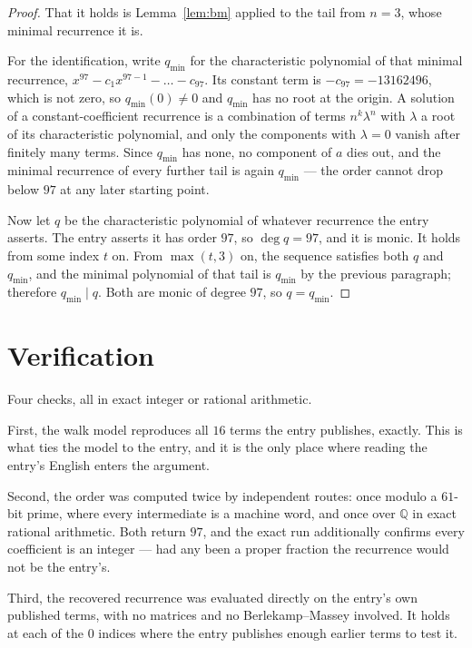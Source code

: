 \documentclass[11pt,a4paper]{article}
\theoremstyle{plain}
\theoremstyle{definition}
\begin{document}
\begin{proof}
That it holds is Lemma~\ref{lem:bm} applied to the tail from $n=3$, whose minimal
recurrence it is.

For the identification, write $q_{\min}$ for the characteristic polynomial of that minimal
recurrence, $x^{97}-c_1x^{97-1}-\dots-c_{97}$. Its constant term is
$-c_{97}=-13162496$, which is not zero, so $q_{\min}(0)\neq0$ and $q_{\min}$ has no
root at the origin. A solution of a constant-coefficient recurrence is a combination of terms
$n^{k}\lambda^{n}$ with $\lambda$ a root of its characteristic polynomial, and only the
components with $\lambda=0$ vanish after finitely many terms. Since $q_{\min}$ has none, no
component of $a$ dies out, and the minimal recurrence of every further tail is again
$q_{\min}$ --- the order cannot drop below $97$ at any later starting point.

Now let $q$ be the characteristic polynomial of whatever recurrence the entry asserts. The
entry asserts it has order $97$, so $\deg q=97$, and it is monic. It holds from some
index $t$ on. From $\max(t,3)$ on, the sequence satisfies both $q$ and $q_{\min}$, and
the minimal polynomial of that tail is $q_{\min}$ by the previous paragraph; therefore
$q_{\min}\mid q$. Both are monic of degree $97$, so $q=q_{\min}$.
\end{proof}

\section{Verification}

Four checks, all in exact integer or rational arithmetic.

First, the walk model reproduces all $16$ terms the entry publishes, exactly. This is
what ties the model to the entry, and it is the only place where reading the entry's English
enters the argument.

Second, the order was computed twice by independent routes: once modulo a $61$-bit prime, where
every intermediate is a machine word, and once over $\mathbb{Q}$ in exact rational arithmetic.
Both return $97$, and the exact run additionally confirms every coefficient is an integer
--- had any been a proper fraction the recurrence would not be the entry's.

Third, the recovered recurrence was evaluated directly on the entry's own published terms, with
no matrices and no Berlekamp--Massey involved. It holds at each of the $0$ indices where
the entry publishes enough earlier terms to test it.
\end{document}
